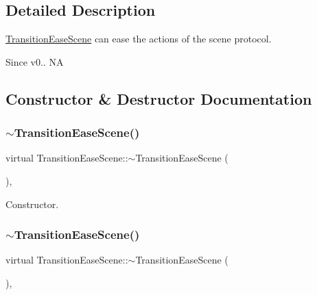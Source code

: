 \subsection{Detailed Description}
\hyperlink{classTransitionEaseScene}{Transition\+Ease\+Scene} can ease the actions of the scene protocol. 

\begin{DoxySince}{Since}
v0..  NA 
\end{DoxySince}


\subsection{Constructor \& Destructor Documentation}
\mbox{\label{classTransitionEaseScene_a38cdd19ad5536c133ced78b117b902b2}} 
\subsubsection{\texorpdfstring{$\sim$\+Transition\+Ease\+Scene()}{~TransitionEaseScene()}\hspace{0.1cm}{\footnotesize\ttfamily [1/2]}}
{\footnotesize\ttfamily virtual Transition\+Ease\+Scene\+::$\sim$\+Transition\+Ease\+Scene (\begin{DoxyParamCaption}{ }\end{DoxyParamCaption})\hspace{0.3cm}{\ttfamily [inline]}, {\ttfamily [virtual]}}

Constructor. \mbox{\label{classTransitionEaseScene_a38cdd19ad5536c133ced78b117b902b2}} 
\subsubsection{\texorpdfstring{$\sim$\+Transition\+Ease\+Scene()}{~TransitionEaseScene()}\hspace{0.1cm}{\footnotesize\ttfamily [2/2]}}
{\footnotesize\ttfamily virtual Transition\+Ease\+Scene\+::$\sim$\+Transition\+Ease\+Scene (\begin{DoxyParamCaption}{ }\end{DoxyParamCaption})\hspace{0.3cm}{\ttfamily [inline]}, {\ttfamily [virtual]}}

